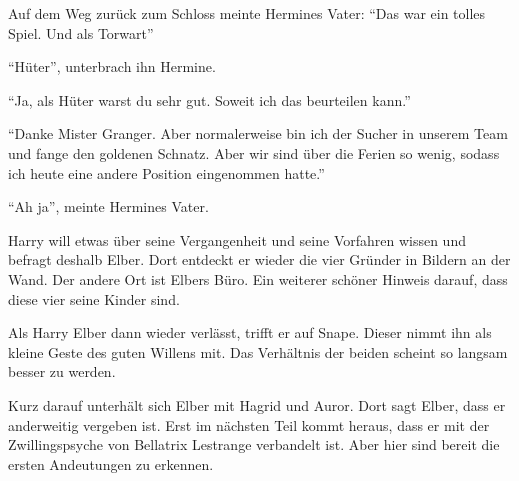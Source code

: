 Auf dem Weg zurück zum Schloss meinte Hermines Vater: \enquote{Das war ein tolles Spiel. Und als Torwart\abs}

\enquote{Hüter}, unterbrach ihn Hermine.

\enquote{Ja, als Hüter warst du sehr gut. Soweit ich das beurteilen kann.}

\enquote{Danke Mister Granger. Aber normalerweise bin ich der Sucher in unserem Team und fange den goldenen Schnatz. Aber wir sind über die Ferien so wenig, sodass ich heute eine andere Position eingenommen hatte.}

\enquote{Ah ja}, meinte Hermines Vater.




\begin{kommentar}
Harry will etwas über seine Vergangenheit und seine Vorfahren wissen und befragt deshalb Elber. Dort entdeckt er wieder die vier Gründer in Bildern an der Wand. Der andere Ort ist Elbers Büro. Ein weiterer schöner Hinweis darauf, dass diese vier seine Kinder sind.
\end{kommentar}

\begin{kommentar}
Als Harry Elber dann wieder verlässt, trifft er auf Snape. Dieser nimmt ihn als kleine Geste des guten Willens mit. Das Verhältnis der beiden scheint so langsam besser zu werden.
\end{kommentar}

\begin{kommentar}
Kurz darauf unterhält sich Elber mit Hagrid und Auror. Dort sagt Elber, dass er anderweitig vergeben ist. Erst im nächsten Teil kommt heraus, dass er mit der Zwillingspsyche von Bellatrix Lestrange verbandelt ist. Aber hier sind bereit die ersten Andeutungen zu erkennen.
\end{kommentar}
